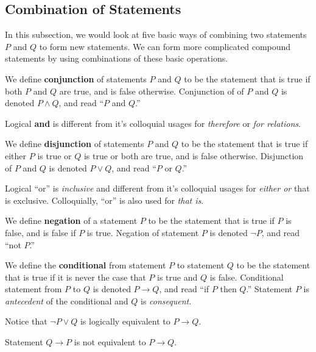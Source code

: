 \documentclass[a4paper,english,12pt]{article}
\begin{document}
\subsection{Combination of Statements }
In this subsection, we would look at five basic ways of combining two statements $P$ and $Q$ to form new statements. We can form more complicated compound statements by using combinations of these basic operations. 
\begin{defn}[Conjunction] We define \textbf{conjunction} of statements $P$ and $Q$ to be the statement that is true if both $P$ and $Q$ are true, and is false otherwise. Conjunction of of $P$ and $Q$ is denoted $P \wedge Q$, and read ``$P$ and $Q$.''
\end{defn}
\begin{rem} Logical \textbf{and} is different from it's colloquial usages for \emph{therefore} or \emph{for relations}.
\end{rem}	
\begin{defn}[Disjunction] We define \textbf{disjunction} of statements $P$ and $Q$ to be the statement that is true if either $P$ is true or $Q$ is true or both are true, and is false otherwise. Disjunction of $P$ and $Q$ is denoted $P \vee Q$, and read ``$P$ or $Q$.''
\end{defn}
\begin{rem} Logical ``or'' is \emph{inclusive} and different from it's colloquial usages for \emph{either or} that is exclusive. Colloquially, ``or'' is also used for \emph{that is}.
\end{rem}			
\begin{defn}[Negation] We define \textbf{negation} of a statement $P$ to be the statement that is true if $P$ is false, and is false if $P$ is true. Negation of statement $P$ is denoted $\neg P$, and read ``not $P$.''	
\end{defn}
\begin{defn}[Conditional] We define the \textbf{conditional} from statement $P$ to statement $Q$ to be the statement that is true if it is never the case that $P$ is true and $Q$ is false. Conditional statement from $P$ to $Q$ is denoted $P \rightarrow Q$, and read ``if $P$ then $Q$.''	Statement $P$ is \emph{antecedent} of the conditional and $Q$ is \emph{consequent}.	
\end{defn}
\begin{rem} Notice that $\neg P \vee Q$ is logically equivalent to $P \rightarrow Q$.
\end{rem}	
\begin{rem} Statement $Q \rightarrow P$ is not equivalent to $P \rightarrow Q$.
\end{rem}	
\end{document}
